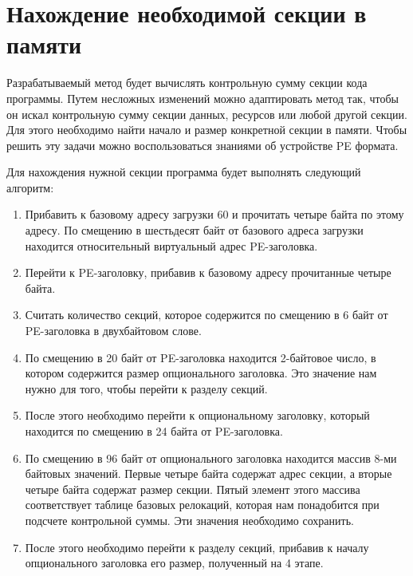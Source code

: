 
\section{Нахождение необходимой секции в памяти}

Разрабатываемый метод будет вычислять контрольную сумму секции кода программы.
Путем несложных изменений можно адаптировать метод так, чтобы он искал
контрольную сумму секции данных, ресурсов или любой другой секции. Для этого
необходимо найти начало и размер конкретной секции в памяти. Чтобы решить эту
задачи можно воспользоваться знаниями об устройстве PE формата. 

Для нахождения нужной секции программа будет выполнять следующий алгоритм:
\begin{enumerate}[label=\arabic*.]
  \item Прибавить к базовому адресу загрузки 60 и прочитать четыре байта по этому
    адресу. По смещению в шестьдесят байт от базового адреса загрузки находится
    относительный виртуальный адрес PE-заголовка.
    
  \item Перейти к PE-заголовку, прибавив к базовому адресу прочитанные четыре
    байта. 

  \item Считать количество секций, которое содержится по смещению в 6 байт от
    PE-заголовка в двухбайтовом слове.

  \item По смещению в 20 байт от PE-заголовка находится 2-байтовое число, в
    котором содержится размер опционального заголовка. Это значение нам нужно
    для того, чтобы перейти к разделу секций.

  \item После этого необходимо перейти к опциональному заголовку, который
    находится по смещению в 24 байта от PE-заголовка. 

  \item По смещению в 96 байт от опционального заголовка находится массив 8-ми
    байтовых значений. Первые четыре байта содержат адрес секции, а вторые
    четыре байта содержат размер секции. Пятый элемент этого массива
    соответствует таблице базовых релокаций, которая нам понадобится при
    подсчете контрольной суммы. Эти значения необходимо сохранить.

  \item После этого необходимо перейти к разделу секций, прибавив к началу
    опционального заголовка его размер, полученный на 4 этапе.


\end{enumerate}
